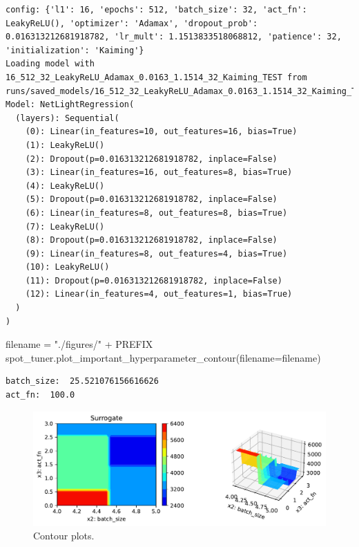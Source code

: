 \documentclass[
  letterpaper,
  DIV=11,
  numbers=noendperiod]{scrreprt}
\newenvironment{Shaded}{\begin{snugshade}}{\end{snugshade}}
\newcommand{\NormalTok}[1]{\textcolor[rgb]{0.00,0.23,0.31}{#1}}
\newcommand{\OperatorTok}[1]{\textcolor[rgb]{0.37,0.37,0.37}{#1}}
\newcommand{\StringTok}[1]{\textcolor[rgb]{0.13,0.47,0.30}{#1}}
\begin{document}
\begin{verbatim}
config: {'l1': 16, 'epochs': 512, 'batch_size': 32, 'act_fn': LeakyReLU(), 'optimizer': 'Adamax', 'dropout_prob': 0.016313212681918782, 'lr_mult': 1.1513833518068812, 'patience': 32, 'initialization': 'Kaiming'}
Loading model with 16_512_32_LeakyReLU_Adamax_0.0163_1.1514_32_Kaiming_TEST from runs/saved_models/16_512_32_LeakyReLU_Adamax_0.0163_1.1514_32_Kaiming_TEST/last.ckpt
Model: NetLightRegression(
  (layers): Sequential(
    (0): Linear(in_features=10, out_features=16, bias=True)
    (1): LeakyReLU()
    (2): Dropout(p=0.016313212681918782, inplace=False)
    (3): Linear(in_features=16, out_features=8, bias=True)
    (4): LeakyReLU()
    (5): Dropout(p=0.016313212681918782, inplace=False)
    (6): Linear(in_features=8, out_features=8, bias=True)
    (7): LeakyReLU()
    (8): Dropout(p=0.016313212681918782, inplace=False)
    (9): Linear(in_features=8, out_features=4, bias=True)
    (10): LeakyReLU()
    (11): Dropout(p=0.016313212681918782, inplace=False)
    (12): Linear(in_features=4, out_features=1, bias=True)
  )
)
\end{verbatim}

\begin{Shaded}
\begin{Highlighting}[]
\NormalTok{filename }\OperatorTok{=} \StringTok{"./figures/"} \OperatorTok{+}\NormalTok{ PREFIX}
\NormalTok{spot\_tuner.plot\_important\_hyperparameter\_contour(filename}\OperatorTok{=}\NormalTok{filename)}
\end{Highlighting}
\end{Shaded}

\begin{verbatim}
batch_size:  25.521076156616626
act_fn:  100.0
\end{verbatim}

\begin{figure}[H]

{\centering \includegraphics{031_spot_lightning_linear_diabetes_files/figure-pdf/cell-19-output-2.pdf}

}

\caption{Contour plots.}

\end{figure}%
\end{document}
